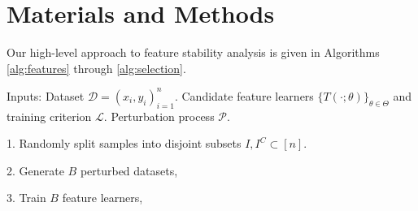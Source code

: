 
\section{Materials and Methods}

Our high-level approach to feature stability analysis is given in Algorithms \ref{alg:features} through \ref{alg:selection}.

\begin{algorithm}[H]
\SetAlgoLined
{}
Inputs: Dataset $\mathcal{D} = \left(x_{i}, y_{i}\right)_{i = 1}^{n}$. Candidate
feature learners $\{T\left(\cdot; \theta\right)\}_{\theta \in \Theta}$ and
training criterion $\mathcal{L}$. Perturbation process $\mathcal{P}$.

1. Randomly split samples into disjoint subsets $I, I^{C} \subset \left[n\right]$.

2. Generate $B$ perturbed datasets,


3. Train $B$ feature learners,

\end{algorithm}




